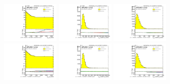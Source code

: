 \begin{figure}[htbp!]
\begin{center}
\includegraphics[width=0.25\textwidth,angle=-90]{figures/boosted/Reweight/Fits/Moriond_bkg_3_NoTag_2Trk_split_subl_Incl_leadHCand_Pt_m_1.pdf}
\includegraphics[width=0.25\textwidth,angle=-90]{figures/boosted/Reweight/Fits/Moriond_bkg_3_NoTag_2Trk_split_subl_Incl_leadHCand_trk0_Pt.pdf}
\includegraphics[width=0.25\textwidth,angle=-90]{figures/boosted/Reweight/Fits/Moriond_bkg_3_NoTag_2Trk_split_subl_Incl_leadHCand_trk1_Pt.pdf} \\
\includegraphics[width=0.25\textwidth,angle=-90]{figures/boosted/Reweight/Fits/Moriond_bkg_9_NoTag_2Trk_split_subl_Incl_leadHCand_Pt_m_1.pdf}
\includegraphics[width=0.25\textwidth,angle=-90]{figures/boosted/Reweight/Fits/Moriond_bkg_9_NoTag_2Trk_split_subl_Incl_leadHCand_trk0_Pt.pdf}
\includegraphics[width=0.25\textwidth,angle=-90]{figures/boosted/Reweight/Fits/Moriond_bkg_9_NoTag_2Trk_split_subl_Incl_leadHCand_trk1_Pt.pdf} \\

\end{center}
\end{figure}
